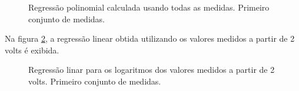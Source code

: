 \documentclass[brazilian,12pt,a4paper,final]{article}
\begin{document}
\begin{figure}[htbp!]
  \caption{Regressão polinomial calculada usando todas as medidas. Primeiro conjunto de medidas.}
  \label{figiniciogr}
  \centering
\end{figure}

Na figura \ref{figfimpeq}, a regressão linear obtida utilizando 
os valores medidos a partir de 2 volts é exibida.

\begin{figure}[htbp!]
  \caption{Regressão linar para os logaritmos dos valores medidos a partir de 2 volts. Primeiro conjunto de medidas.}
  \label{figfimpeq}
  \centering
\end{figure}
\end{document}
